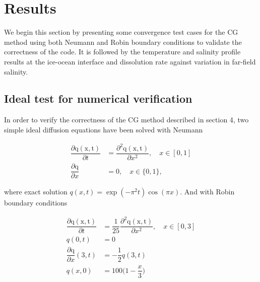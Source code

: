 \documentclass[11pt,a4paper]{article}
\begin{document}

	
	\section{Results}
	
	We begin this section by presenting some convergence test cases for the CG method using both Neumann and Robin boundary conditions to validate the correctness of the code. It is followed by the temperature and salinity profile results at the ice-ocean interface and dissolution rate against variation in far-field salinity.
	
	\subsection{Ideal test for numerical verification}
	
	In order to verify the correctness of the CG method described in section 4, two simple ideal diffusion equations have been solved with Neumann 
	
	\begin{align*}
	    \dfrac{\partial\mathrm{q(x,t)}}{\partial t} & = \dfrac{\partial^2\mathrm{q(x,t)}}{\partial x^2}, \quad x\in [0,1]\\
	    \dfrac{\partial\mathrm{q}}{\partial x} & = 0, \quad x\in \{0,1\},
	\end{align*}
	
	where exact solution $ q(x,t) = \exp(-\pi^2t)\cos(\pi x)$. And with Robin boundary conditions 
	
	\begin{align*}
	    \dfrac{\partial\mathrm{q(x,t)}}{\partial t} & = \dfrac{1}{25}\dfrac{\partial^2\mathrm{q(x,t)}}{\partial x^2}, \quad x\in [0,3]\\
	    q(0,t) &= 0\\
        \dfrac{\partial\mathrm{q}}{\partial x}(3,t) &= -\dfrac{1}{2}q(3,t)\\
        q(x,0) &= 100\bigg(1-\dfrac{x}{3}\bigg)\\
	\end{align*}
	
\end{document}
